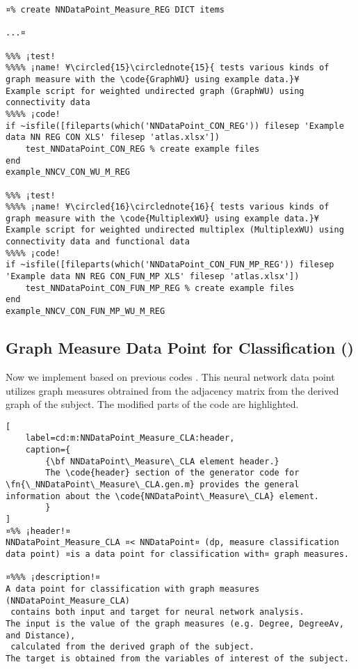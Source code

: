\documentclass{tufte-handout}
\begin{document}
\begin{lstlisting}
¤% create NNDataPoint_Measure_REG DICT items

...¤

%%% ¡test!
%%%% ¡name! ¥\circled{15}\circlednote{15}{ tests various kinds of graph measure with the \code{GraphWU} using example data.}¥
Example script for weighted undirected graph (GraphWU) using connectivity data
%%%% ¡code!
if ~isfile([fileparts(which('NNDataPoint_CON_REG')) filesep 'Example data NN REG CON XLS' filesep 'atlas.xlsx'])
    test_NNDataPoint_CON_REG % create example files
end
example_NNCV_CON_WU_M_REG

%%% ¡test!
%%%% ¡name! ¥\circled{16}\circlednote{16}{ tests various kinds of graph measure with the \code{MultiplexWU} using example data.}¥
Example script for weighted undirected multiplex (MultiplexWU) using connectivity data and functional data
%%%% ¡code!
if ~isfile([fileparts(which('NNDataPoint_CON_FUN_MP_REG')) filesep 'Example data NN REG CON_FUN_MP XLS' filesep 'atlas.xlsx'])
    test_NNDataPoint_CON_FUN_MP_REG % create example files
end
example_NNCV_CON_FUN_MP_WU_M_REG

\end{lstlisting}

\clearpage
\subsection{Graph Measure Data Point for Classification ()}

Now we implement  based on previous codes .
This neural network data point utilizes graph measures obtrained from the adjacency matrix from the derived graph of the subject. 
The modified parts of the code are highlighted.

\begin{lstlisting}[
	label=cd:m:NNDataPoint_Measure_CLA:header,
	caption={
		{\bf NNDataPoint\_Measure\_CLA element header.}
		The \code{header} section of the generator code for \fn{\_NNDataPoint\_Measure\_CLA.gen.m} provides the general information about the \code{NNDataPoint\_Measure\_CLA} element.
		}
]
¤%% ¡header!¤
NNDataPoint_Measure_CLA ¤< NNDataPoint¤ (dp, measure classification data point) ¤is a data point for classification with¤ graph measures.

¤%%% ¡description!¤
A data point for classification with graph measures (NNDataPoint_Measure_CLA) 
 contains both input and target for neural network analysis.
The input is the value of the graph measures (e.g. Degree, DegreeAv, and Distance), 
 calculated from the derived graph of the subject.
The target is obtained from the variables of interest of the subject.
\end{lstlisting}
\end{document}

